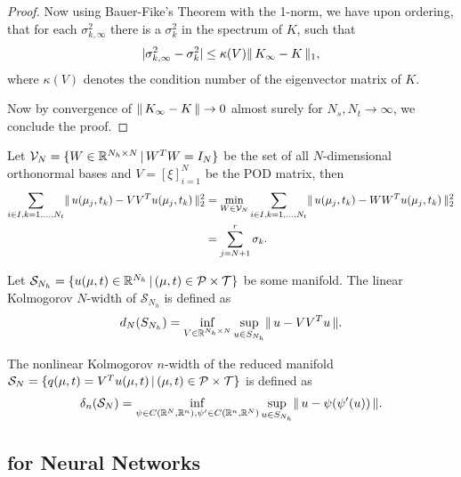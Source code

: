 \begin{proof}
    
    Now using Bauer-Fike's Theorem with the 1-norm, we have upon ordering, that for each $\sigma^2_{k,\infty}$ there is a $\sigma^2_k$ in the spectrum of $K$, such that
    \begin{equation*}
        \vert \sigma_{k, \infty}^2 - \sigma_k^2  \vert \leq \kappa(V) \lVert \, K_\infty - K \, \rVert_1,
    \end{equation*}
    where $\kappa(V)$ denotes the condition number of the eigenvector matrix of $K$. 
    
    
    Now by convergence of $\lVert \, K_\infty - K \, \rVert \to 0$ almost surely for $N_s, N_t \to \infty$, we conclude the proof. 
\end{proof}

\begin{proposition} \label{prop: eigenvalues and optimal projection under sampling}
    Let $\mathcal{V}_N = \{ W \in \mathbb{R}^{N_h \times N} \, \vert \, W^T W = I_N \}$ be the set of all $N$-dimensional orthonormal bases and $V = [\xi]_{i=1}^N$ be the POD matrix, then
    \begin{align*}
        \sum\limits_{i \in I, k = 1, \dots, N_t} \lVert \, u(\mu_j, t_k) - V V^T u(\mu_j, t_k) \, \rVert_2^2 &= \min\limits_{W \in \mathcal{V}_N} \sum\limits_{i \in I, k = 1, \dots, N_t} \lVert \, u(\mu_j, t_k) - W W^T u(\mu_j, t_k) \, \rVert_2^2 \\
        &= \sum_{j=N+1}^r \sigma_k.
    \end{align*}
\end{proposition}

\begin{definition} \label{def: linear kolmogorov}
    Let $\mathcal{S}_{N_h} = \{ u(\mu, t) \in \mathbb{R}^{N_h} \, \vert \, (\mu, t) \in \mathcal{P} \times \mathcal{T} \}$ be some manifold. The linear Kolmogorov $N$-width of $\mathcal{S}_{N_h}$ is defined as
    \begin{equation*}
        d_N(S_{N_h}) = \inf\limits_{V \in \mathbb{R}^{N_h \times N}} \sup\limits_{u \in S_{N_h}} \lVert \, u - V V^T u \, \rVert.
    \end{equation*}
\end{definition}

\begin{definition} \label{def: nonlinear kolmogorov}
    The nonlinear Kolmogorov $n$-width of the reduced manifold $\mathcal{S}_N = \{ q(\mu, t) = V^T u(\mu, t) \, \vert \, (\mu, t) \in \mathcal{P} \times \mathcal{T} \}$ is defined as 
    \begin{equation*}
        \delta_n(\mathcal{S}_N) = \inf\limits_{\psi \in C(\mathbb{R}^N, \mathbb{R}^n), \psi' \in C(\mathbb{R}^n, \mathbb{R}^N)} \sup\limits_{u \in S_{N_h}} \lVert \, u - \psi(\psi'(u)) \, \rVert.
    \end{equation*}
\end{definition}

\subsection{for Neural Networks} \label{section: background for nn}

